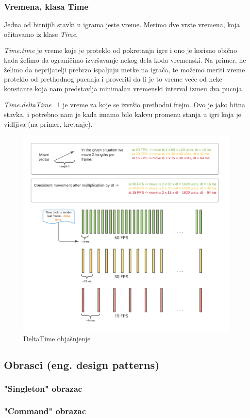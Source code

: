 \subsubsection{Vremena, klasa Time}
Jedna od bitnijih stavki u igrama jeste vreme. Merimo dve vrste vremena, koja o\v{c}itavamo iz klase \emph{Time}.

\emph{Time.time} je vreme koje je proteklo od pokretanja igre i ono je korisno
obi\v{c}no kada \v{z}elimo da ograni\v{c}imo izvr\v{s}avanje nekog dela koda vremenski.
Na primer, ne \v{z}elimo da neprijatelji prebrzo ispaljuju metke na igra\v{c}a, te mo\v{z}emo meriti
vreme proteklo od prethodnog pucanja i proveriti da li je to vreme ve\'ce od neke konstante
koja nam predstavlja minimalan vremenski interval izme\dj u dva pucnja.

\emph{Time.deltaTime} ~\ref{fig:deltatime} je vreme za koje se izvr\v{s}io prethodni frejm. Ovo je jako bitna stavka,
i potrebno nam je kada imamo bilo kakvu promenu stanja u igri koja je vidljiva (na primer, kretanje). 

\begin{center}
    \begin{figure}
        \includegraphics[width=1\textwidth]{Figures/DeltaTime.pdf}
        \caption{DeltaTime obja\v{s}njenje}
        \label{fig:deltatime}
    \end{figure}
\end{center}

\subsection{Obrasci (eng. design patterns)}
\subsubsection{"Singleton" obrazac}
\subsubsection{"Command" obrazac}
